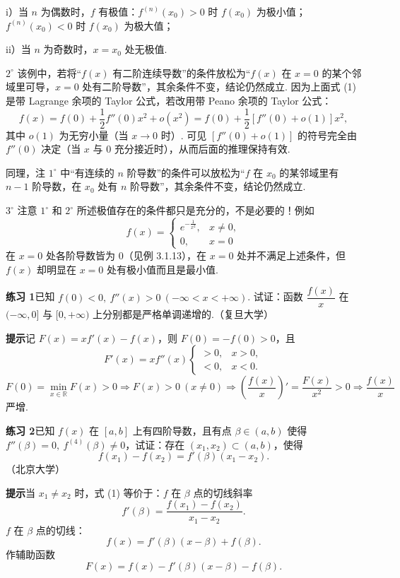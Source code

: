 \documentclass[UTF8,12pt,a4paper,fontset=fandol]{ctexart}
\begin{document}
i）当 $n$ 为偶数时，$f$ 有极值：$f^{(n)}(x_0)>0$ 时 $f(x_0)$ 为极小值；$f^{(n)}(x_0)<0$ 时 $f(x_0)$ 为极大值；

ii）当 $n$ 为奇数时，$x=x_0$ 处无极值.

$2^\circ$ 该例中，若将“$f(x)$ 有二阶连续导数”的条件放松为“$f(x)$ 在 $x=0$ 的某个邻域里可导，$x=0$ 处有二阶导数”，其余条件不变，结论仍然成立. 因为上面式 (1) 是带 Lagrange 余项的 Taylor 公式，若改用带 Peano 余项的 Taylor 公式：
\[
  f(x)=f(0)+\frac12f''(0)x^2+o(x^2)
  =f(0)+\frac12[f''(0)+o(1)]x^2,
\]
其中 $o(1)$ 为无穷小量（当 $x\to0$ 时）. 可见 $[f''(0)+o(1)]$ 的符号完全由 $f''(0)$ 决定（当 $x$ 与 0 充分接近时），从而后面的推理保持有效.

同理，注 $1^\circ$ 中“有连续的 $n$ 阶导数”的条件可以放松为“$f$ 在 $x_0$ 的某邻域里有 $n-1$ 阶导数，在 $x_0$ 处有 $n$ 阶导数”，其余条件不变，结论仍然成立.

$3^\circ$ 注意 $1^\circ$ 和 $2^\circ$ 所述极值存在的条件都只是充分的，不是必要的！例如
\[
  f(x)=
  \begin{cases}
  e^{-\frac1{x^2}}, & x\ne0,\\
  0, & x=0
  \end{cases}
\]
在 $x=0$ 处各阶导数皆为 0（见例 3.1.13），在 $x=0$ 处并不满足上述条件，但 $f(x)$ 却明显在 $x=0$ 处有极小值而且是最小值.

\noindent\textbf{练习 1}\quad 已知 $f(0)<0,\ f''(x)>0\ (-\infty<x<+\infty)$. 试证：函数 $\dfrac{f(x)}x$ 在 $(-\infty,0]$ 与 $[0,+\infty)$ 上分别都是严格单调递增的.（复旦大学）

\noindent\textbf{提示}\quad 记 $F(x)=xf'(x)-f(x)$，则 $F(0)=-f(0)>0$，且
\[
  F'(x)=xf''(x)
  \begin{cases}
  >0, & x>0,\\
  <0, & x<0.
  \end{cases}
\]
$F(0)=\min\limits_{x\in\mathbb R}F(x)>0\Rightarrow F(x)>0\ (x\ne0)\Rightarrow \left(\dfrac{f(x)}x\right)'=\dfrac{F(x)}{x^2}>0\Rightarrow \dfrac{f(x)}x$ 严增.

\noindent\textbf{练习 2}\quad 已知 $f(x)$ 在 $[a,b]$ 上有四阶导数，且有点 $\beta\in(a,b)$ 使得 $f''(\beta)=0,\ f^{(4)}(\beta)\ne0$，试证：存在 $(x_1,x_2)\subset(a,b)$，使得
\[
  f(x_1)-f(x_2)=f'(\beta)(x_1-x_2). \tag{1}
\]
（北京大学）

\noindent\textbf{提示}\quad 当 $x_1\ne x_2$ 时，式 (1) 等价于：$f$ 在 $\beta$ 点的切线斜率
\[
  f'(\beta)=\frac{f(x_1)-f(x_2)}{x_1-x_2}.
\]
$f$ 在 $\beta$ 点的切线：
\[
  f(x)=f'(\beta)(x-\beta)+f(\beta).
\]
作辅助函数
\[
  F(x)=f(x)-f'(\beta)(x-\beta)-f(\beta).
\]
\end{document}
